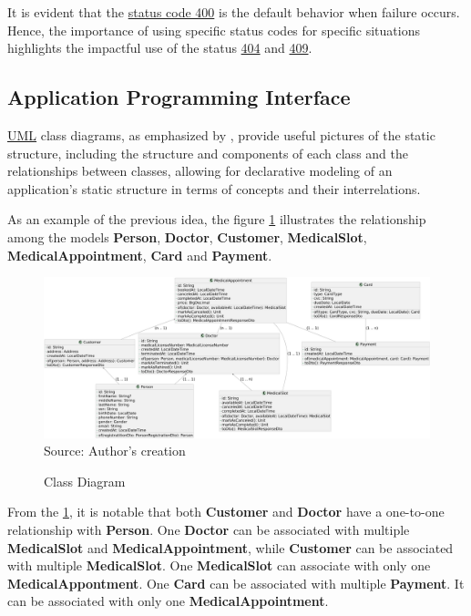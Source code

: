 It is evident that the \hyperref[tab:summary_http_status_codes]{status code 400} is the default behavior when failure occurs. Hence, the importance of using specific status
 codes for specific situations highlights the impactful use of the status \hyperref[appendix:http_status_codes_summary_appendix]{404} and \hyperref[appendix:http_status_codes_summary_appendix]{409}.

\subsection{Application Programming Interface}
\label{subsection:api}

\hyperref[appendix:glossary]{UML} class diagrams, as emphasized by \cite{BERARDI200570, herchi_abdessalem_2012}, provide useful pictures of the static structure, including the structure and components of each class and the relationships between classes, allowing for declarative modeling of an application's static structure in terms of concepts and their interrelations.

As an example of the previous idea, the figure \ref{fig:class_diagram} illustrates the relationship among the models \textbf{Person}, \textbf{Doctor}, \textbf{Customer}, \textbf{MedicalSlot}, \textbf{MedicalAppointment}, \textbf{Card} and \textbf{Payment}.

\begin{landscape}
\begin{figure}[H]
    \caption{Class Diagram}
    \centering
    \includegraphics[width=1\linewidth]{figures/class_diagram.png}
    \label{fig:class_diagram}
    \\ \footnotesize Source: Author's creation
\end{figure}
\end{landscape}

From the \ref{fig:class_diagram}, it is notable that both \textbf{Customer} and \textbf{Doctor} have a one-to-one relationship with \textbf{Person}. One \textbf{Doctor} can be associated with multiple  \textbf{MedicalSlot} and 
\textbf{MedicalAppointment}, while \textbf{Customer} can be associated with multiple \textbf{MedicalSlot}. One \textbf{MedicalSlot} can associate with only one \textbf{MedicalAppontment}. One \textbf{Card} can be associated with multiple  \textbf{Payment}. It can be associated with only one \textbf{MedicalAppointment}.


